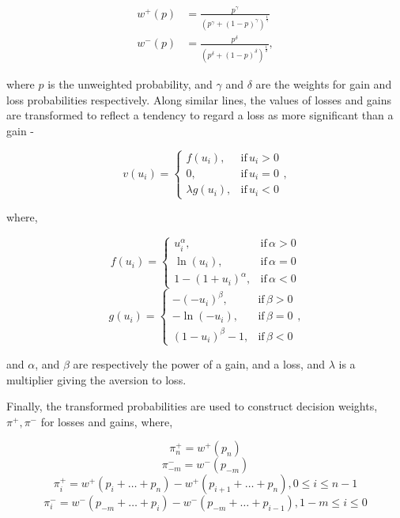 \documentclass[graybox]{svmult}
\begin{document}
\begin{align}
w^{+}(p) & = \frac{p^{\gamma}}{(p^{\gamma}+(1-p)^{\gamma})^{\frac{1}{\gamma}}}\label{eqn:cpt_p_pos}\\
w^{-}(p) & = \frac{p^{\delta}}{(p^{\delta}+(1-p)^{\delta})^{\frac{1}{\delta}}}\label{eqn:cpt_p_neg},
\end{align}


where $p$ is the unweighted probability, and $\gamma$ and $\delta$
are the weights for gain and loss probabilities respectively. Along similar lines, the values of losses and gains are transformed to reflect a tendency to regard a loss as more significant than a gain  -

\begin{equation}
v(u_{i})=\begin{cases}
f(u_{i}),& \text{if}\, u_{i}>0\\
0,& \text{if}\, u_{i}=0\\
\lambda g(u_{i}),& \text{if}\, u_{i}<0
\end{cases},
\end{equation}


where,

\begin{equation}
f(u_{i})=\begin{cases}
u_{i}^{\alpha},& \text{if}\,\alpha>0\\
\ln(u_{i}),& \text{if}\,\alpha=0\\
1-(1+u_{i})^{\alpha},& \text{if}\,\alpha<0
\end{cases}
\end{equation}
\begin{equation}
g(u_{i})=\begin{cases}
-(-u_{i})^{\beta},& \text{if}\,\beta>0\\
-\ln(-u_{i}),& \text{if}\,\beta=0\\
(1-u_{i})^{\beta}-1,& \text{if}\,\beta<0
\end{cases},
\end{equation}


and $\alpha$, and $\beta$ are respectively the power of a gain,
and a loss, and \(\lambda\) is a multiplier giving the aversion to loss.

Finally, the transformed probabilities are used to construct decision weights, \(\pi^{+},\pi^{-}\) for losses and gains, where,

\begin{equation}
\pi_{n}^{+}=w^{+}(p_{n})
\end{equation}
\begin{equation}
\pi_{-m}^{-}=w^{-}(p_{-m})
\end{equation}
\begin{equation}
\pi_{i}^{+}=w^{+}(p_{i}+\ldots+p_{n}) - w^{+}(p_{i+1}+\ldots+p_{n}),0\leq i \leq n - 1
\end{equation}
\begin{equation}
\pi_{i}^{-}=w^{-}(p_{-m}+\ldots+p_{i}) - w^{-}(p_{-m}+\ldots+p_{i-1}),1-m\leq i \leq 0
\end{equation}
\end{document}
